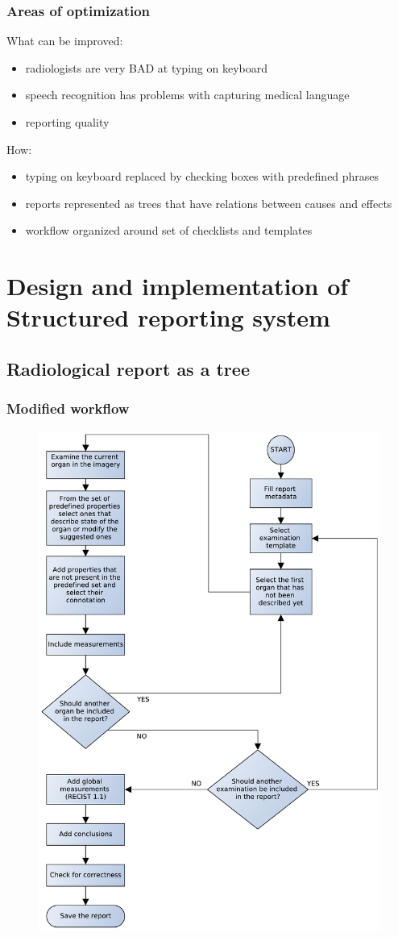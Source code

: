 \documentclass{beamer}
\begin{document}
\begin{frame}
\frametitle{Areas of optimization}
What can be improved:
\begin{itemize}
	\item radiologists are \alert{very BAD} at typing on keyboard
	\item speech recognition has problems with capturing medical language
	\item reporting quality  
\end{itemize}

How:
\begin{itemize}
	\item typing on keyboard replaced by checking boxes with predefined phrases
	\item reports represented as trees that have relations between causes and effects
	\item workflow organized around set of checklists and \alert{templates}
\end{itemize}
\end{frame}


\section{Design and implementation of Structured reporting system}
\subsection{Radiological report as a tree}

\begin{frame}
\frametitle{Modified workflow}
\begin{figure}
	\centering
	\includegraphics[width=0.5\linewidth]{../report-workflow}
	\label{fig:report-workflow}
\end{figure}
\end{frame}
\end{document}
